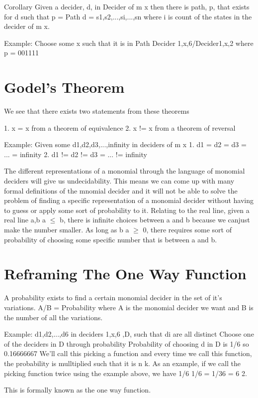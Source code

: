 Corollary
Given a decider, d, in Decider of m x then there is path, p, that exists for d such that p = Path d = s1,s2,...,si,...,sn where i is count of the states in the decider of m x.

Example:
Choose some x such that it is in Path Decider 1,x,6/Decider1,x,2 where p = 001111

\section{Godel's Theorem}

We see that there exists two statements from these theorems

1. x = x from a theorem of equivalence
2. x != x from a theorem of reversal


Example:
Given some d1,d2,d3,...,infinity in deciders of m x
1. d1 = d2 = d3 = ... = infinity
2. d1 != d2 != d3 = ... != infinity

The different representations of a monomial through the language of monomial deciders will give us undecidability. This means we can come up with many formal definitions of the mnomial decider and it will not be able to solve the problem of finding a specific representation of a monomial decider without having to guess or apply some sort of probability to it. Relating to the real line, given a real line a,b a $\leq$ b, there is infinite choices between a and b because we canjust make the number smaller. As long as b  a $\geq $ 0, there requires some sort of probability of choosing some specific number that is between a and b.

\section{Reframing The One Way Function}

A probability exists to find a certain monomial decider in the set of it's variations. A/B = Probability where A is the monomial decider we want and B is the number of all the variations.

Example:
d1,d2,...,d6 in deciders 1,x,6 ,D, such that di are all distinct
Choose one of the deciders in D through probability
Probability of choosing d in D is 1/6 so 0.16666667
We'll call this picking a function and every time we call this function, the probability is mulltiplied such that it is n k. As an example, if we call the picking function twice using the example above, we have 1/6 1/6 = 1/36 = 6 2.

This is formally known as the one way function.

